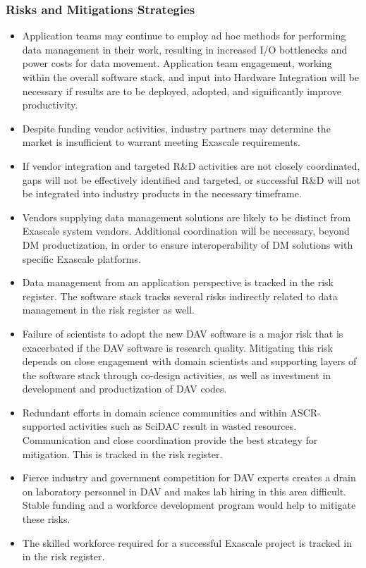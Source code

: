 \subsubsection{Risks and Mitigations Strategies}
\begin{itemize}
\item Application teams may continue to employ ad hoc methods for performing data management in their work, resulting in increased I/O bottlenecks and power costs for data movement. Application team engagement, working within the overall software stack, and input into Hardware Integration will be necessary if results are to be deployed, adopted, and significantly improve productivity.
\item Despite funding vendor activities, industry partners may determine the market is insufficient to warrant meeting Exascale requirements.
\item If vendor integration and targeted R\&D activities are not closely coordinated, gaps will not be effectively identified and targeted, or successful R\&D will not be integrated into industry products in the necessary timeframe.
\item Vendors supplying data management solutions are likely to be distinct from Exascale system vendors. Additional coordination will be necessary, beyond DM productization, in order to ensure interoperability of DM solutions with specific Exascale platforms.
\item Data management from an application perspective is tracked in the risk register. The software stack tracks several risks indirectly related to data management in the risk register as well.
\item Failure of scientists to adopt the new DAV software is a major risk that is exacerbated if the DAV software is research quality. Mitigating this risk depends on close engagement with domain scientists and supporting layers of the software stack through co-design activities, as well as investment in development and productization of DAV codes.
\item Redundant efforts in domain science communities and within ASCR-supported activities such as SciDAC result in wasted resources. Communication and close coordination provide the best strategy for mitigation. This is tracked in the risk register.
\item Fierce industry and government competition for DAV experts creates a drain on laboratory personnel in DAV and makes lab hiring in this area difficult. Stable funding and a workforce development program would help to mitigate these risks.
\item The skilled workforce required for a successful Exascale project is tracked in in the risk register.
\end{itemize}
